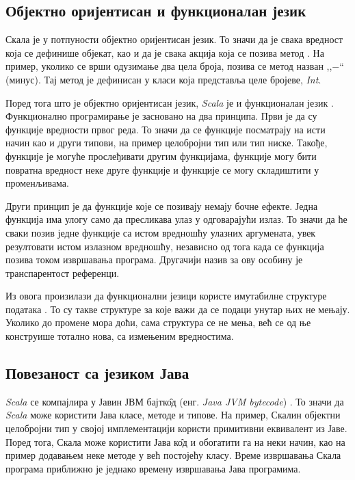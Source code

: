 \documentclass[12pt,oneside]{memoir}
\begin{document}
\subsection{Објектно оријентисан и функционалан језик}
\label{subsec:scala_obj_prog}

Скала је у потпуности објектно оријентисан језик. То значи да је свака вредност која се дефинише објекат, као и да је свака акција која се позива метод \cite{scala_prog}. На пример, уколико се врши одузимање два цела броја, позива се метод назван ,,$-$`` (минус). Тај метод је дефинисан у класи која представља целе бројеве, \textit{Int}. 

Поред тога што је објектно оријентисан језик, \textit{Scala} је и функционалан језик \cite{scala_prog}. Функционално програмирање је засновано на два принципа. Први је да су функције вредности првог реда. То значи да се функције посматрају на исти начин као и други типови, на пример целобројни тип или тип ниске. Такође, функције је могуће прослеђивати другим функцијама, функције могу бити повратна вредност неке друге функције и функције се могу складиштити у променљивама.

Други принцип је да функције које се позивају немају бочне ефекте. Једна функција има улогу само да пресликава улаз у одговарајући излаз. То значи да ће сваки позив једне функције са истом вредношћу улазних аргумената, увек резултовати истом излазном вредношћу, независно од тога када се функција позива током извршавања програма. Другачији назив за ову особину је транспарентост референци.

Из овога произилази да функционални језици користе имутабилне структуре података \cite{scala_prog}. То су такве структуре за које важи да се подаци унутар њих не мењају. Уколико до промене мора доћи, сама структура се не мења, већ се од ње конструише тотално нова, са измењеним вредностима.


\subsection{Повезаност са језиком Јава}
\label{subsec:scala_komp}

\textit{Scala} се компајлира у Јавин ЈВМ бајтк\^{о}д (енг. \textit{Java JVM bytecode}) \cite{scala_prog}. То значи да \textit{Scala} може користити Јава класе, методе и типове. На пример, Скалин објектни целобројни тип у својој имплементацији користи примитивни еквивалент из Јаве. Поред тога, Скала може користити Јава к\^{о}д и обогатити га на неки начин, као на пример додавањем неке методе у већ постојећу класу. Време извршавања Скала програма приближно је једнако времену извршавања Јава програмима.
\end{document}
